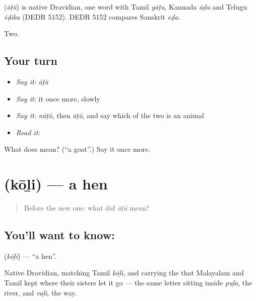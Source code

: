 \begin{cousinweb}
\textbf{} (\emph{āṭŭ}) is native Dravidian, one word with Tamil \emph{yāṭu}, Kannada \emph{āḍu} and Telugu \emph{ēḍika} (DEDR 5152). DEDR 5152 compares Sanskrit \emph{eḍa}.
\end{cousinweb}

\begin{grammarlens}[title={What you've built}]
Two.
\end{grammarlens}

\subsection*{Your turn}
\begin{itemize}
\raggedright
  \item \emph{Say it:} \emph{āṭŭ}
  \item \emph{Say it:} it once more, slowly
  \item \emph{Say it:} \emph{nāṭŭ}, then \emph{āṭŭ}, and say which of the two is an animal
  \item \emph{Read it:} \textbf{}
\end{itemize}

\begin{tcolorbox}[breakable,colback=teal!4,colframe=teal!35!black,title={Before you move on}]
What does  mean? (\textquotedblleft{}a goat\textquotedblright{}.) Say it once more.
\end{tcolorbox}
\section[\texorpdfstring{\ml{കോഴി} (kōḻi)}{കോഴി (kōḻi)}]{ (kōḻi) — a hen}

\label{lesson:ML-C60-hen}



\begin{quote}
Before the new one: what did \emph{āṭŭ} mean?
\end{quote}

\subsection*{You'll want to know: }
\textbf{} (\emph{kōḻi}) — \textquotedblleft{}a hen\textquotedblright{}.

Native Dravidian, matching Tamil \emph{kōḻi}, and carrying the  that Malayalam and Tamil kept where their sisters let it go — the same letter sitting inside \emph{puḻa}, the river, and \emph{vaḻi}, the way.

